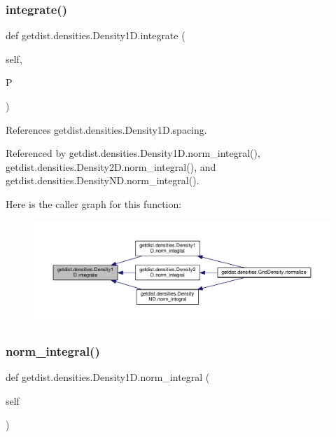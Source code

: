 \subsubsection{\texorpdfstring{integrate()}{integrate()}}
{\footnotesize\ttfamily def getdist.\+densities.\+Density1\+D.\+integrate (\begin{DoxyParamCaption}\item[{}]{self,  }\item[{}]{P }\end{DoxyParamCaption})}



References getdist.\+densities.\+Density1\+D.\+spacing.



Referenced by getdist.\+densities.\+Density1\+D.\+norm\+\_\+integral(), getdist.\+densities.\+Density2\+D.\+norm\+\_\+integral(), and getdist.\+densities.\+Density\+N\+D.\+norm\+\_\+integral().

Here is the caller graph for this function\+:
\nopagebreak
\begin{figure}[H]
\begin{center}
\leavevmode
\includegraphics[width=350pt]{classgetdist_1_1densities_1_1Density1D_a6422563b78860b3e11f080eed5b0ccfd_icgraph}
\end{center}
\end{figure}
\mbox{\label{classgetdist_1_1densities_1_1Density1D_a843a026a18dc4edf2ea12ee731e68c79}} 
\subsubsection{\texorpdfstring{norm\+\_\+integral()}{norm\_integral()}}
{\footnotesize\ttfamily def getdist.\+densities.\+Density1\+D.\+norm\+\_\+integral (\begin{DoxyParamCaption}\item[{}]{self }\end{DoxyParamCaption})}



